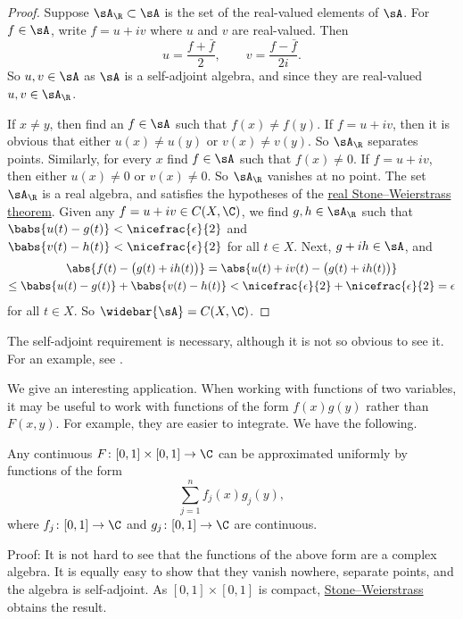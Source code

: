 \begin{proof}
Suppose $\sA_\R \subset \sA$ is the set of the real-valued elements of
$\sA$.
For $f \in \sA$, write $f = u+iv$ where $u$ and $v$ are real-valued.
Then
\begin{equation*}
u = \frac{f+\bar{f}}{2}, \qquad
v = \frac{f-\bar{f}}{2i} .
\end{equation*}
So $u, v \in \sA$ as $\sA$ is a self-adjoint algebra, and since they are
real-valued $u, v \in \sA_\R$.

If $x \not= y$, then find an $f \in \sA$ such that $f(x) \not= f(y)$.  If $f
= u+iv$, then it is obvious that either $u(x) \not= u(y)$ or $v(x) \not=
v(y)$.  So $\sA_\R$ separates points.
%
Similarly, for every $x$ find $f \in \sA$ such that $f(x) \not= 0$.  If $f
= u+iv$, then either $u(x) \not= 0$ or $v(x) \not= 0$.
So $\sA_\R$ vanishes at no point.
%
The set $\sA_\R$ is a real algebra, and satisfies the hypotheses of the
\hyperref[thm:SWreal]{real Stone--Weierstrass theorem}.
Given any $f = u+iv \in C(X,\C)$,
we find $g,h \in \sA_\R$ such that
$\babs{u(t)-g(t)} < \nicefrac{\epsilon}{2}$ and
$\babs{v(t)-h(t)} < \nicefrac{\epsilon}{2}$ for all $t \in X$.
Next, $g+i h \in \sA$, and
\begin{multline*}
\abs{f(t) - \bigl(g(t)+ih(t)\bigr)} = 
\abs{u(t)+iv(t) - \bigl(g(t)+ih(t)\bigr)} \\
\leq
\babs{u(t)-g(t)}+\babs{v(t)-h(t)} < \nicefrac{\epsilon}{2} +
\nicefrac{\epsilon}{2} = \epsilon
\end{multline*}
for all $t \in X$.
So $\widebar{\sA} = C(X,\C)$.
\end{proof}

The self-adjoint requirement is necessary, although it is not so obvious to
see it.  For an example, see .

We give an interesting application.
When working
with functions of two variables, it may be useful to work with functions
of the form $f(x)g(y)$ rather than $F(x,y)$.  For example, they are easier
to integrate.  We have the following.

\begin{example}
Any continuous $F \colon [0,1] \times [0,1] \to \C$ can be
approximated uniformly by functions of the form
\begin{equation*}
\sum_{j=1}^n f_j(x) g_j(y) ,
\end{equation*}
where $f_j \colon [0,1] \to \C$ and $g_j \colon [0,1] \to \C$ are continuous.

Proof:
It is not hard to see that the functions of the above form are a complex
algebra.  It is equally easy to show that they vanish nowhere, separate
points, and the algebra is self-adjoint.  As $[0,1] \times [0,1]$ is
compact,
\hyperref[thm:SWcomplex]{Stone--Weierstrass} obtains the result.
\end{example}

